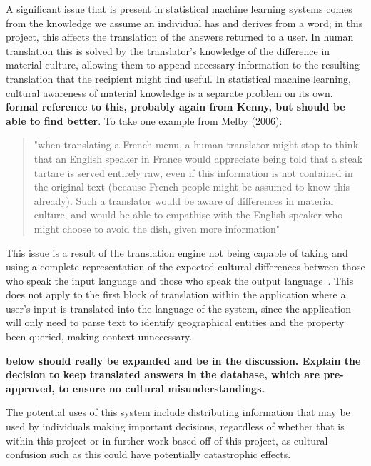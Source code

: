 \documentclass[authoryearcitations]{UoYCSproject}
\begin{document}
A significant issue that is present in statistical machine learning systems comes from the knowledge we assume an individual has and derives from a word; in this project, this affects the translation of the answers returned to a user.  In human translation this is solved by the translator's knowledge of the difference in material culture, allowing them to append necessary information to the resulting translation that the recipient might find useful.  In statistical machine learning, cultural awareness of material knowledge is a separate problem on its own.  {\bf formal reference to this, probably again from Kenny, but should be able to find better}.  To take one example from Melby (2006):

\blockquote{"when translating a French menu, a human translator might stop to think that an English speaker in France would appreciate being told that a steak tartare is served entirely raw, even if this information is not contained in the original text (because French people might be assumed to know this already). Such a translator would be aware of differences in material culture, and would be able to empathise with the English speaker who might choose to avoid the dish, given more information"~\cite{melby2006can, kenny2011ethics}}

This issue is a result of the translation engine not being capable of taking and using a complete representation of the expected cultural differences between those who speak the input language and those who speak the output language~\cite{melby2006can}. This does not apply to the first block of translation within the application where a user's input is translated into the language of the system, since the application will only need to parse text to identify geographical entities and the property been queried, making context unnecessary.

{\bf below should really be expanded and be in the discussion.  Explain the decision to keep translated answers in the database, which are pre-approved, to ensure no cultural misunderstandings.}

The potential uses of this system include distributing information that may be used by individuals making important decisions, regardless of whether that is within this project or in further work based off of this project, as cultural confusion such as this could have potentially catastrophic effects.
\end{document}
